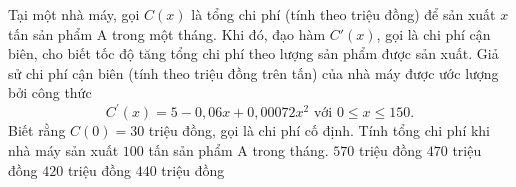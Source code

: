 \begin{ex}%
	Tại một nhà máy, gọi $C(x)$ là tổng chi phí (tính theo triệu đồng) để sản xuất $x$ tấn sản phẩm A trong một tháng. Khi đó, đạo hàm $C'(x)$, gọi là chi phí cận biên, cho biết tốc độ tăng tổng chi phí theo lượng sản phẩm được sản xuất. Giả sử chi phí cận biên (tính theo triệu đồng trên tấn) của nhà máy được ước lượng bởi công thức
	$$
	C^{\prime}(x)=5-0,06 x+0,00072 x^2 \text { với } 0 \leq x \leq 150 .
	$$
	Biết rằng $C(0)=30$ triệu đồng, gọi là chi phí cố định. Tính tổng chi phí khi nhà máy sản xuất $100$ tấn sản phẩm A trong tháng.
	\choice
	{$570$ triệu đồng}
	{\True $470$ triệu đồng}
	{$420$ triệu đồng}
	{$440$ triệu đồng}
\end{ex}


